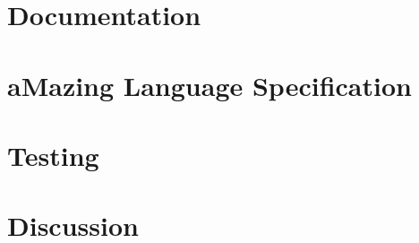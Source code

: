\documentclass[12pt, a4paper]{article}
\begin{document}
\section{Documentation}

\newpage

\section{aMazing Language Specification}

\newpage

\section{Testing}

\newpage

\section{Discussion}

\newpage



\end{document}
